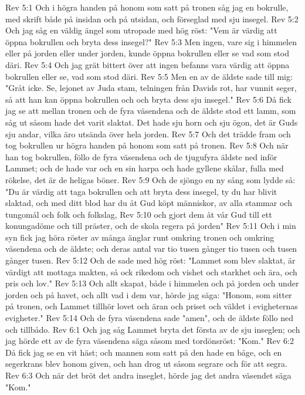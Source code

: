 Rev 5:1  Och i högra handen på honom som satt på tronen såg jag en bokrulle, med skrift både på insidan och på utsidan, och förseglad med sju insegel.
Rev 5:2  Och jag såg en väldig ängel som utropade med hög röst: "Vem är värdig att öppna bokrullen och bryta dess insegel?"
Rev 5:3  Men ingen, vare sig i himmelen eller på jorden eller under jorden, kunde öppna bokrullen eller se vad som stod däri.
Rev 5:4  Och jag grät bittert över att ingen befanns vara värdig att öppna bokrullen eller se, vad som stod däri.
Rev 5:5  Men en av de äldste sade till mig: "Gråt icke. Se, lejonet av Juda stam, telningen från Davids rot, har vunnit seger, så att han kan öppna bokrullen och och bryta dess sju insegel."
Rev 5:6  Då fick jag se att mellan tronen och de fyra väsendena och de äldste stod ett lamm, som såg ut såsom hade det varit slaktat. Det hade sju horn och sju ögon, det är Guds sju andar, vilka äro utsända över hela jorden.
Rev 5:7  Och det trädde fram och tog bokrullen ur högra handen på honom som satt på tronen.
Rev 5:8  Och när han tog bokrullen, föllo de fyra väsendena och de tjugufyra äldste ned inför Lammet; och de hade var och en sin harpa och hade gyllene skålar, fulla med rökelse, det är de heligas böner.
Rev 5:9  Och de sjöngo en ny sång som lydde så: "Du är värdig att taga bokrullen och att bryta dess insegel, ty du har blivit slaktad, och med ditt blod har du åt Gud köpt människor, av alla stammar och tungomål och folk och folkslag,
Rev 5:10  och gjort dem åt vår Gud till ett konungadöme och till präster, och de skola regera på jorden"
Rev 5:11  Och i min syn fick jag höra röster av många änglar runt omkring tronen och omkring väsendena och de äldste; och deras antal var tio tusen gånger tio tusen och tusen gånger tusen.
Rev 5:12  Och de sade med hög röst: "Lammet som blev slaktat, är värdigt att mottaga makten, så ock rikedom och vishet och starkhet och ära, och pris och lov."
Rev 5:13  Och allt skapat, både i himmelen och på jorden och under jorden och på havet, och allt vad i dem var, hörde jag säga: "Honom, som sitter på tronen, och Lammet tillhör lovet och äran och priset och väldet i evigheternas evigheter."
Rev 5:14  Och de fyra väsendena sade "amen", och de äldste föllo ned och tillbådo.
Rev 6:1  Och jag såg Lammet bryta det första av de sju inseglen; och jag hörde ett av de fyra väsendena säga såsom med tordönsröst: "Kom."
Rev 6:2  Då fick jag se en vit häst; och mannen som satt på den hade en båge, och en segerkrans blev honom given, och han drog ut såsom segrare och för att segra.
Rev 6:3  Och när det bröt det andra inseglet, hörde jag det andra väsendet säga "Kom."
